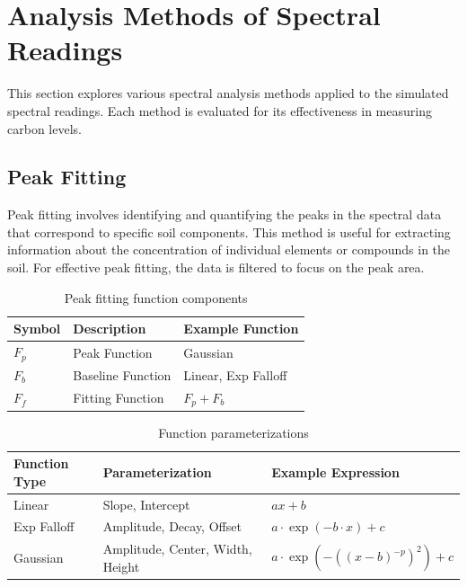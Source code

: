 \documentclass[review]{elsarticle}
\begin{document}
\section{Analysis Methods of Spectral Readings}

This section explores various spectral analysis methods applied to the simulated spectral readings. Each method is evaluated for its effectiveness in measuring carbon levels.

\subsection{Peak Fitting}

Peak fitting involves identifying and quantifying the peaks in the spectral data that correspond to specific soil components. This method is useful for extracting information about the concentration of individual elements or compounds in the soil. For effective peak fitting, the data is filtered to focus on the peak area.

\begin{table}[H]
\centering
\caption{Peak fitting function components}
\label{tab:peak_functions}
\begin{tabular}{@{}lll@{}}
\toprule
Symbol & Description & Example Function \\
\midrule
$F_p$ & Peak Function & Gaussian \\
$F_b$ & Baseline Function & Linear, Exp Falloff \\
$F_f$ & Fitting Function & $F_p + F_b$ \\
\bottomrule
\end{tabular}
\end{table}

\begin{table}[H]
\centering
\caption{Function parameterizations}
\label{tab:function_params}
\begin{tabular}{@{}lll@{}}
\toprule
Function Type & Parameterization & Example Expression \\
\midrule
Linear & Slope, Intercept & $ax + b$ \\
Exp Falloff & Amplitude, Decay, Offset & $a \cdot \exp(-b \cdot x) + c$ \\
Gaussian & Amplitude, Center, Width, Height & $a \cdot \exp(-((x - b)^{-p})^2) + c$ \\
\bottomrule
\end{tabular}
\end{table}
\end{document}
